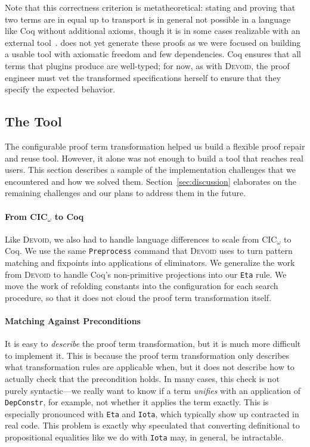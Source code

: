 Note that this correctness criterion is metatheoretical:
stating and proving that two terms are in equal up to transport is in general not possible in a language like Coq
without additional axioms, though it is in some cases realizable with an external tool~\cite{tabareau2017equivalences}.
\toolname does not yet generate these proofs as we were focused on building a usable tool with axiomatic freedom and few dependencies.
Coq ensures that all terms that plugins produce are well-typed; for now, as with \textsc{Devoid}, the proof engineer must vet the transformed
specifications herself to ensure that they specify the expected behavior.

\subsection{The Tool}
\label{sec:implementation}

The configurable proof term transformation helped us build a flexible proof repair and reuse tool.
However, it alone was not enough to build a tool that reaches real users.
This section describes a sample of the implementation challenges that we encountered and how we solved them.
Section~\ref{sec:discussion} elaborates on the remaining challenges and our plans to address them in the future.

\paragraph{From CIC$_{\omega}$ to Coq}

Like \textsc{Devoid}, we also had to handle language differences to scale from CIC$_{\omega}$ to Coq.
We use the same \lstinline{Preprocess} command that \textsc{Devoid} uses to turn pattern matching and fixpoints into applications of eliminators.
We generalize the work from \textsc{Devoid} to handle Coq's non-primitive projections into our \lstinline{Eta} rule.
We move the work of refolding constants into the configuration for each search procedure, so that it does not
cloud the proof term transformation itself.

\paragraph{Matching Against Preconditions}

It is easy to \textit{describe} the proof term transformation, but it is much more difficult to implement it.
This is because the proof term transformation only describes what transformation rules are applicable when,
but it does not describe how to actually check that the precondition holds.
In many cases, this check is not purely syntactic---we really want to know if a term \textit{unifies}
with an application of \lstinline{DepConstr}, for example, not whether it applies the term exactly.
This is especially pronounced with \lstinline{Eta} and \lstinline{Iota},
which typically show up contracted in real code.
This problem is exactly why \citet{tabareau2019marriage} speculated that converting definitional to propositional equalities
like we do with \lstinline{Iota} may, in general, be intractable.

